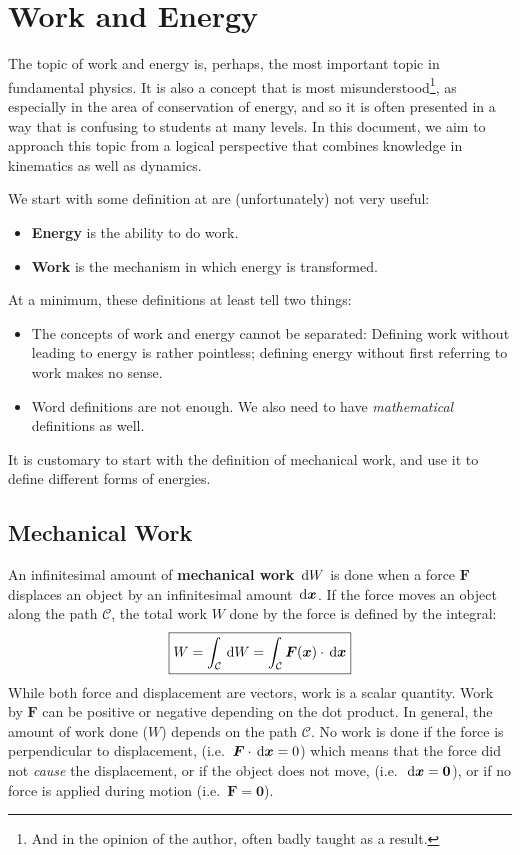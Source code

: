 \chapter{Work and Energy}
\label{chapter:energy}


The topic of work and energy is, perhaps, the most important topic in
fundamental physics. It is also a concept that is most
misunderstood\footnote{And in the opinion of the author, often badly taught as
a result.}, as especially in the area of conservation of energy, and so it is
often presented in a way that is confusing to students at many levels. In this
document, we aim to approach this topic from a logical perspective that
combines knowledge in kinematics as well as dynamics.

We start with some definition at are (unfortunately) not very useful:
\begin{itemize}[nosep]
\item \textbf{Energy} is the ability to do work.
\item \textbf{Work} is the mechanism in which energy is transformed.
\end{itemize}
At a minimum, these definitions at least tell two things:
\begin{itemize}
\item The concepts of work and energy cannot be separated: Defining work
  without leading to energy is rather pointless; defining energy without first
  referring to work makes no sense.
\item Word definitions are not enough. We also need to have \emph{mathematical}
  definitions as well.
\end{itemize}
It is customary to start with the definition of mechanical work, and use it
to define different forms of energies.

\section{Mechanical Work}
\label{sec:mechwork}
An infinitesimal amount of \textbf{mechanical work} $\dl W$ is done when a
force $\bm F$ displaces an object by an infinitesimal amount
$\dl{\bm x}$. If the force moves an object along the path $\mathcal C$, the
total work $W$ done by the force is defined by the integral:
\begin{equation}
  \boxed{
    W=\int_{\mathcal C}\dl W=\int_{\mathcal C}\bm F(\bm x)\cdot\dl{\bm x}
  }
  \label{work-definition}
\end{equation}
While both force and displacement are vectors, work is a scalar quantity. Work
by $\bm F$ can be positive or negative depending on the dot product. In
general, the amount of work done ($W$) depends on the path $\mathcal C$. %
No work is done if the force is perpendicular to displacement, (i.e.\
$\bm F\cdot\dl{\bm x}=0$) which means that the force did not \emph{cause}
the displacement, or if the object does not move, (i.e.\
$\dl{\bm x}=\bm 0$), or if no force is applied during motion (i.e.\
$\bm F=\bm 0$).


